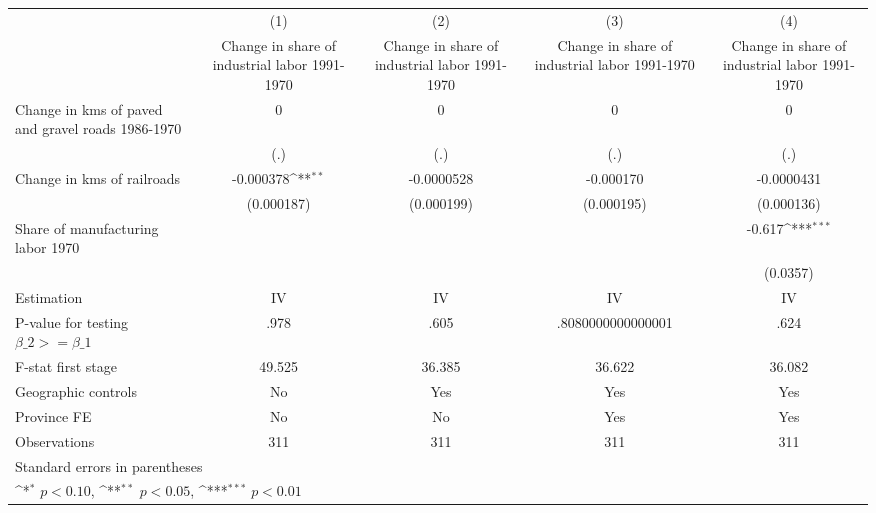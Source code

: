 {
\def\sym#1{\ifmmode^{#1}\else\(^{#1}\)\fi}
\begin{tabular}{l*{4}{c}}
\hline\hline
                    &\multicolumn{1}{c}{(1)}&\multicolumn{1}{c}{(2)}&\multicolumn{1}{c}{(3)}&\multicolumn{1}{c}{(4)}\\
                    &\multicolumn{1}{c}{Change in share of industrial labor 1991-1970}&\multicolumn{1}{c}{Change in share of industrial labor 1991-1970}&\multicolumn{1}{c}{Change in share of industrial labor 1991-1970}&\multicolumn{1}{c}{Change in share of industrial labor 1991-1970}\\
\hline
Change in kms of paved and gravel roads 1986-1970&           0         &           0         &           0         &           0         \\
                    &         (.)         &         (.)         &         (.)         &         (.)         \\
[1em]
Change in kms of railroads&   -0.000378\sym{**} &  -0.0000528         &   -0.000170         &  -0.0000431         \\
                    &  (0.000187)         &  (0.000199)         &  (0.000195)         &  (0.000136)         \\
[1em]
Share of manufacturing labor 1970&                     &                     &                     &      -0.617\sym{***}\\
                    &                     &                     &                     &    (0.0357)         \\
\hline
Estimation          &          IV         &          IV         &          IV         &          IV         \\
P-value for testing $\beta\_2 >= \beta\_1$&        .978         &        .605         &.8080000000000001         &        .624         \\
F-stat first stage  &      49.525         &      36.385         &      36.622         &      36.082         \\
Geographic controls &          No         &         Yes         &         Yes         &         Yes         \\
Province FE         &          No         &          No         &         Yes         &         Yes         \\
Observations        &         311         &         311         &         311         &         311         \\
\hline\hline
\multicolumn{5}{l}{\footnotesize Standard errors in parentheses}\\
\multicolumn{5}{l}{\footnotesize \sym{*} \(p<0.10\), \sym{**} \(p<0.05\), \sym{***} \(p<0.01\)}\\
\end{tabular}
}
